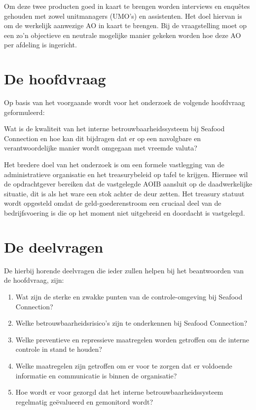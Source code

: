 Om deze twee producten goed in kaart te brengen worden interviews en enquêtes gehouden met zowel unitmanagers (UMO's) en assistenten. Het doel hiervan is om de werkelijk aanwezige AO in kaart te brengen. Bij de vraagstelling moet op een zo'n objectieve en neutrale mogelijke manier gekeken worden hoe deze AO per afdeling is ingericht.

\newpage
\section{De hoofdvraag}
Op basis van het voorgaande wordt voor het onderzoek de volgende hoofdvraag geformuleerd:

\bigskip

\noindent
\begin{center}
\textnormal{\large{Wat is de kwaliteit van het interne betrouwbaarheidssysteem bij Seafood Connection en hoe kan dit bijdragen dat er op een navolgbare en verantwoordelijke manier wordt omgegaan met vreemde valuta?}}
\end{center}

\bigskip

Het bredere doel van het onderzoek is om een formele vastlegging van de administratieve organisatie en het treasurybeleid op tafel te krijgen. Hiermee wil de opdrachtgever bereiken dat de vastgelegde AOIB aansluit op de daadwerkelijke situatie, dit is als het ware een stok achter de deur zetten. Het treasury statuut wordt opgesteld omdat de geld-goederenstroom een cruciaal deel van de bedrijfsvoering is die op het moment niet uitgebreid en doordacht is vastgelegd.


\section{De deelvragen}
De hierbij horende deelvragen die ieder zullen helpen bij het beantwoorden van de hoofdvraag, zijn:

\begin{enumerate}
    \item Wat zijn de sterke en zwakke punten van de controle-omgeving bij Seafood Connection?
    \item Welke betrouwbaarheidsrisico's zijn te onderkennen bij Seafood Connection?
    \item Welke preventieve en repressieve maatregelen worden getroffen om de interne controle in stand te houden?
    \item Welke maatregelen zijn getroffen om er voor te zorgen dat er voldoende informatie en communicatie is binnen de organisatie?
    \item Hoe wordt er voor gezorgd dat het interne betrouwbaarheidssysteem regelmatig geëvalueerd en gemonitord wordt?
\end{enumerate}